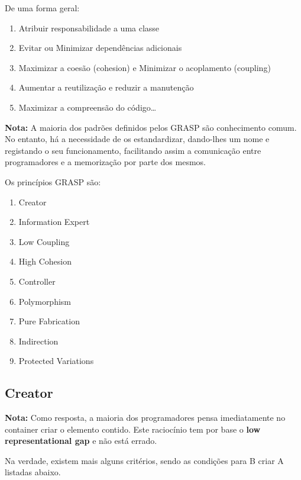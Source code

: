 \documentclass{article}
\begin{document}
\pagebreak

De uma forma geral:

\begin{enumerate}
    \item Atribuir responsabilidade a uma classe
    \item Evitar ou Minimizar dependências adicionais
    \item Maximizar a coesão (cohesion) e Minimizar o acoplamento (coupling)
    \item Aumentar a reutilização e reduzir a manutenção
    \item Maximizar a compreensão do código\dots
\end{enumerate}

\begin{flushleft}
    \textbf{Nota:} A maioria dos padrões definidos pelos GRASP são conhecimento comum. No entanto, há a necessidade de
    os estandardizar, dando-lhes um nome e registando o seu funcionamento, facilitando assim a
    comunicação entre programadores e a memorização por parte dos mesmos.
\end{flushleft}

Os princípios GRASP são:

\begin{enumerate}
    \item Creator
    \item Information Expert
    \item Low Coupling
    \item High Cohesion
    \item Controller
    \item Polymorphism
    \item Pure Fabrication
    \item Indirection
    \item Protected Variations
\end{enumerate}

\pagebreak

\subsection{Creator}

\begin{flushleft}
    \textbf{Nota:} Como resposta, a maioria dos programadores pensa imediatamente no container criar o elemento contido.
    Este raciocínio tem por base o \textbf{low representational gap} e não está errado.

    Na verdade, existem mais alguns critérios, sendo as condições para B criar A listadas abaixo.
\end{flushleft}
\end{document}
